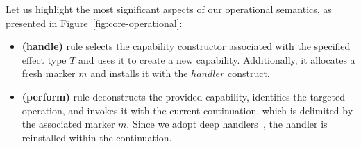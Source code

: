 \documentclass[acmsmall,review,screen]{acmart}
\begin{document}
Let us highlight the most significant aspects of our operational semantics, as presented in Figure~\ref{fig:core-operational}:
\begin{itemize}
    \item \textbf{(handle)} rule selects the capability constructor associated with the specified effect type $T$ and uses it to create a new capability.
    Additionally, it allocates a fresh marker $m$ and installs it with the $handler$ construct.
    \item \textbf{(perform)} rule deconstructs the provided capability, identifies the targeted operation, and invokes it with the current continuation, which is delimited by the associated marker $m$.
    Since we adopt deep handlers~\cite{hillerstrom2018shallow}, the handler is reinstalled within the continuation.
\end{itemize}
\end{document}
